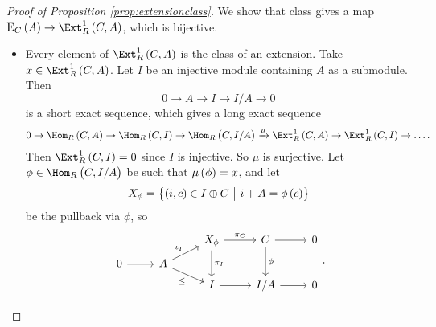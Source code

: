 \begin{proof}[Proof of Proposition \ref{prop:extensionclass}]
We show that class gives a map $ \E_C\br{A} \to \Ext_R^1\br{C, A} $, which is bijective.
\begin{itemize}
\item Every element of $ \Ext_R^1\br{C, A} $ is the class of an extension. Take $ x \in \Ext_R^1\br{C, A} $. Let $ I $ be an injective module containing $ A $ as a submodule. Then
$$ 0 \to A \to I \to I / A \to 0 $$
is a short exact sequence, which gives a long exact sequence
$$ 0 \to \Hom_R\br{C, A} \to \Hom_R\br{C, I} \to \Hom_R\br{C, I / A} \xrightarrow{\mu} \Ext_R^1\br{C, A} \to \Ext_R^1\br{C, I} \to \dots. $$
Then $ \Ext_R^1\br{C, I} = 0 $ since $ I $ is injective. So $ \mu $ is surjective. Let $ \phi \in \Hom_R\br{C, I / A} $ be such that $ \mu\br{\phi} = x $, and let
$$ X_\phi = \cbr{\br{i, c} \in I \oplus C \st i + A = \phi\br{c}} $$
be the pullback via $ \phi $, so
$$
\begin{tikzcd}[row sep=tiny]
& & X_\phi \arrow{r}{\pi_C} \arrow{dd}{\pi_I} & C \arrow{r} \arrow{dd}{\phi} & 0 \\
0 \arrow{r} & A \arrow{ur}{\iota_I} \arrow[swap]{dr}{\le} & & \\
& & I \arrow{r} & I / A \arrow{r} & 0
\end{tikzcd}.
$$

\pagebreak


\end{itemize}
\end{proof}
